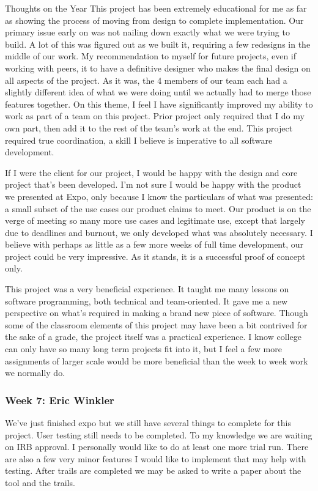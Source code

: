 Thoughts on the Year
This project has been extremely educational for me as far as showing the process of moving from design to complete implementation. Our primary issue early on was not nailing down exactly what we were trying to build. A lot of this was figured out as we built it, requiring a few redesigns in the middle of our work. My recommendation to myself for future projects, even if working with peers, it to have a definitive designer who makes the final design on all aspects of the project. As it was, the 4 members of our team each had a slightly different idea of what we were doing until we actually had to merge those features together. On this theme, I feel I have significantly improved my ability to work as part of a team on this project. Prior project only required that I do my own part, then add it to the rest of the team's work at the end. This project required true coordination, a skill I believe is imperative to all software development.

If I were the client for our project, I would be happy with the design and core project that's been developed. I'm not sure I would be happy with the product we presented at Expo, only because I know the particulars of what was presented: a small subset of the use cases our product claims to meet. Our product is on the verge of meeting so many more use cases and legitimate use, except that largely due to deadlines and burnout, we only developed what was absolutely necessary. I believe with perhaps as little as a few more weeks of full time development, our project could be very impressive. As it stands, it is a successful proof of concept only. 

This project was a very beneficial experience. It taught me many lessons on software programming, both technical and team-oriented. It gave me a new perspective on what's required in making a brand new piece of software. Though some of the classroom elements of this project may have been a bit contrived for the sake of a grade, the project itself was a practical experience. I know college can only have so many long term projects fit into it, but I feel a few more assignments of larger scale would be more beneficial than the week to week work we normally do. 



\subsubsection{Week 7: Eric Winkler}

We've just finished expo but we still have several things to complete for this project. User testing still needs to be completed. To my knowledge we are waiting on IRB approval. I personally would like to do at least one more trial run. There are also a few very minor features I would like to implement that may help with testing. After trails are completed we may be asked to write a paper about the tool and the trails.

